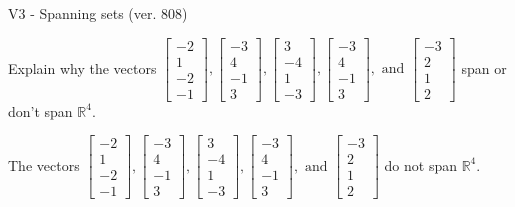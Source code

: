 \begin{exercise}
  \begin{exerciseTitle}V3 - Spanning sets (ver. 808)\end{exerciseTitle}
  \begin{exerciseStatement}
    Explain why the vectors \(\left[\begin{array}{r}
-2 \\
1 \\
-2 \\
-1
\end{array}\right] , \left[\begin{array}{r}
-3 \\
4 \\
-1 \\
3
\end{array}\right] , \left[\begin{array}{r}
3 \\
-4 \\
1 \\
-3
\end{array}\right] , \left[\begin{array}{r}
-3 \\
4 \\
-1 \\
3
\end{array}\right] , \text{ and } \left[\begin{array}{r}
-3 \\
2 \\
1 \\
2
\end{array}\right]\) span or don't span \(\mathbb{R}^4\). 
	


  \end{exerciseStatement}
  \begin{exerciseAnswer}
   The vectors \(\left[\begin{array}{r}
-2 \\
1 \\
-2 \\
-1
\end{array}\right] , \left[\begin{array}{r}
-3 \\
4 \\
-1 \\
3
\end{array}\right] , \left[\begin{array}{r}
3 \\
-4 \\
1 \\
-3
\end{array}\right] , \left[\begin{array}{r}
-3 \\
4 \\
-1 \\
3
\end{array}\right] , \text{ and } \left[\begin{array}{r}
-3 \\
2 \\
1 \\
2
\end{array}\right]\) 
  	 do not  
	span \(\mathbb{R}^4\).
  



\end{exerciseAnswer}
\end{exercise}
